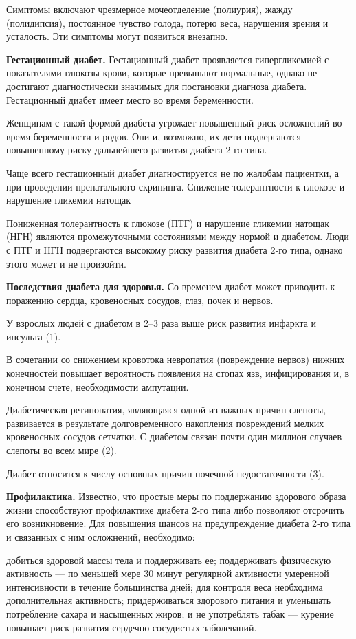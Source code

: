 Симптомы включают чрезмерное мочеотделение (полиурия), жажду (полидипсия), постоянное чувство голода, потерю веса, нарушения зрения и усталость. Эти симптомы могут появиться внезапно.

\textbf{Гестационный диабет.} Гестационный диабет проявляется гипергликемией с показателями глюкозы крови, которые превышают нормальные, однако не достигают диагностически значимых для постановки диагноза диабета. Гестационный диабет имеет место во время беременности.

Женщинам с такой формой диабета угрожает повышенный риск осложнений во время беременности и родов. Они и, возможно, их дети подвергаются повышенному риску дальнейшего развития диабета 2‑го типа.

Чаще всего гестационный диабет диагностируется не по жалобам пациентки, а при проведении пренатального скрининга.
Снижение толерантности к глюкозе и нарушение гликемии натощак

Пониженная толерантность к глюкозе (ПТГ) и нарушение гликемии натощак (НГН) являются промежуточными состояниями между нормой и диабетом. Люди с ПТГ и НГН подвергаются высокому риску развития диабета 2‑го типа, однако этого может и не произойти.


\textbf{Последствия диабета для здоровья.}
Со временем диабет может приводить к поражению сердца, кровеносных сосудов, глаз, почек и нервов.

У взрослых людей с диабетом в 2–3 раза выше риск развития инфаркта и инсульта (1).

В сочетании со снижением кровотока невропатия (повреждение нервов) нижних конечностей повышает вероятность появления на стопах язв, инфицирования и, в конечном счете, необходимости ампутации.

Диабетическая ретинопатия, являющаяся одной из важных причин слепоты, развивается в результате долговременного накопления повреждений мелких кровеносных сосудов сетчатки. С диабетом связан почти один миллион случаев слепоты во всем мире (2).

Диабет относится к числу основных причин почечной недостаточности (3).

\textbf{Профилактика.} Известно, что простые меры по поддержанию здорового образа жизни способствуют профилактике диабета 2‑го типа либо позволяют отсрочить его возникновение. Для повышения шансов на предупреждение диабета 2‑го типа и связанных с ним осложнений, необходимо:

добиться здоровой массы тела и поддерживать ее; поддерживать физическую активность — по меньшей мере 30 минут регулярной активности умеренной интенсивности в течение большинства дней; для контроля веса необходима дополнительная активность; придерживаться здорового питания и уменьшать потребление сахара и насыщенных жиров; и не употреблять табак — курение повышает риск развития сердечно-сосудистых заболеваний.

